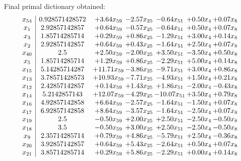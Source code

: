 \documentclass[8pt]{article}
\begin{document}
 Final primal dictionary obtained: 
\[\begin{array}{c| c c@{\hskip 2pt} c@{\hskip 2pt} c@{\hskip 2pt} c@{\hskip 2pt} c@{\hskip 2pt} }
 x_{54}   &  0.928571428572 & +  3.64 x_{59} & -2.57 x_{25} & -0.64 x_{51} & +  0.50 x_{4} & +  0.07 x_{8}\\
 x_{1}   &  2.92857142857 & +  0.64 x_{59} & -0.57 x_{25} & -0.64 x_{51} & +  0.50 x_{4} & +  0.07 x_{8}\\
 x_{3}   &  1.85714285714 & +  0.29 x_{59} & +  0.86 x_{25} & -1.29 x_{51} & +  3.00 x_{4} & +  0.14 x_{8}\\
 x_{2}   &  2.92857142857 & +  0.64 x_{59} & +  0.43 x_{25} & -1.64 x_{51} & +  2.50 x_{4} & +  0.07 x_{8}\\
 x_{40}   &  2.5 & +  2.50 x_{59} & -2.00 x_{25} & +  3.50 x_{51} & -3.50 x_{4} & +  0.50 x_{8}\\
 x_{5}   &  1.85714285714 & +  1.29 x_{59} & +  0.86 x_{25} & -2.29 x_{51} & +  5.00 x_{4} & +  0.14 x_{8}\\
 x_{15}   &  5.14285714287 & + 11.71 x_{59} & -3.86 x_{25} & -9.71 x_{51} & +  3.00 x_{4} & +  0.86 x_{8}\\
 x_{13}   &  3.78571428573 & + 10.93 x_{59} & -7.71 x_{25} & -4.93 x_{51} & +  1.50 x_{4} & +  0.21 x_{8}\\
 x_{12}   &  2.42857142857 & +  0.14 x_{59} & +  1.43 x_{25} & +  1.86 x_{51} & -2.00 x_{4} & -0.43 x_{8}\\
 x_{14}   &  5.2142857143 & + 12.07 x_{59} & -4.29 x_{25} & -10.07 x_{51} & +  3.50 x_{4} & +  0.79 x_{8}\\
 x_{16}   &  4.92857142858 & +  6.64 x_{59} & -2.57 x_{25} & -1.64 x_{51} & -1.50 x_{4} & +  0.07 x_{8}\\
 x_{17}   &  6.92857142858 & +  8.64 x_{59} & -3.57 x_{25} & -1.64 x_{51} & -2.50 x_{4} & +  0.07 x_{8}\\
 x_{19}   &  2.5 & -0.50 x_{59} & +  2.00 x_{25} & +  2.50 x_{51} & -2.50 x_{4} & -0.50 x_{8}\\
 x_{18}   &  3.5 & -0.50 x_{59} & +  3.00 x_{25} & +  2.50 x_{51} & -2.50 x_{4} & -0.50 x_{8}\\
 x_{9}   &  2.35714285714 & +  0.79 x_{59} & +  4.86 x_{25} & -5.79 x_{51} & +  2.50 x_{4} & -0.36 x_{8}\\
 x_{20}   &  3.92857142857 & +  0.64 x_{59} & +  5.43 x_{25} & -2.64 x_{51} & +  0.50 x_{4} & +  0.07 x_{8}\\
 x_{21}   &  3.85714285714 & +  0.29 x_{59} & +  5.86 x_{25} & -2.29 x_{51} & +  0.00 x_{4} & +  0.14 x_{8}\\

\end{array}\]
\end{document}
